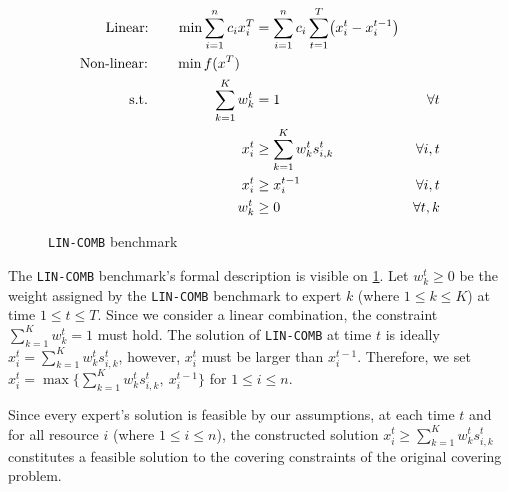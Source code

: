 \begin{figure}
	\vspace{-0.5cm}
	\begin{mdframed}
	\vspace{-0.2cm}
		\begin{align*}
			\text{Linear:}  \qquad \min \sum_{i=1}^{n} c_{i} x_{i}^{T} &= \sum_{i=1}^{n} c_{i} \sum_{t=1}^{T}\bigl( x_{i}^{t} - x_{i}^{t-1}\bigr) & \\
			\text{Non-linear:} \qquad \min f(x^{T}) \hspace{0.37cm} & & \\
			\text{s.t.} \hspace{1.63cm}
			\sum_{k=1}^{K} w_{k}^{t} &= 1 \qquad &\forall t \\
			\qquad x_{i}^{t} &\geq \sum_{k=1}^{K} w_{k}^{t} s_{i,k}^{t}  \qquad &\forall i, t\\
			\qquad x_{i}^{t} &\geq x_{i}^{t-1} \qquad &\forall i, t \\
			\qquad w_{k}^{t} &\geq 0 \qquad &\forall t, k
		\end{align*}
	\end{mdframed}
	\vspace{-0.2cm}
	\caption{\texttt{LIN-COMB} benchmark}
	\label{fig:benchmark}
	\vspace{-0.5cm}
\end{figure}

The \texttt{LIN-COMB} benchmark's formal description is visible on \cref{fig:benchmark}.
Let $w_{k}^{t} \geq 0$ be the weight assigned by the \texttt{LIN-COMB} benchmark to expert $k$ (where $1 \leq k \leq K$) at time
$1 \leq t \leq T$.
Since we consider a linear combination, the constraint $ \sum_{k=1}^{K} w_{k}^{t} = 1$ must hold.
The solution of \texttt{LIN-COMB} at time $t$ is ideally $x_{i}^{t} = \sum_{k=1}^{K} w_{k}^{t} s_{i,k}^{t}$,
however, $x_{i}^{t}$ must be larger than $x_{i}^{t-1}$.
Therefore, we set $x_{i}^{t} = \max\bigl\{\sum_{k=1}^{K} w_{k}^{t} s_{i,k}^{t},\ x_{i}^{t-1}\bigr\}$ for $1 \leq i \leq n$.
%


Since every expert's solution is feasible by our assumptions, at each time $t$ and for all resource $i$ (where $1 \leq i \leq n$),
the constructed solution $x_{i}^{t} \geq \sum_{k=1}^{K} w_{k}^{t} s_{i,k}^{t}$ constitutes a feasible solution to the covering constraints of the original covering problem.

